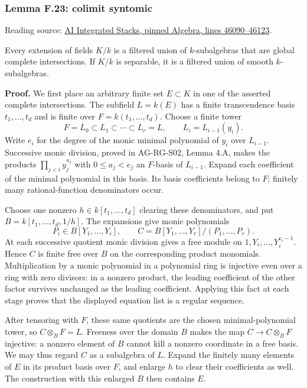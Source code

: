 \documentclass[11pt,a4paper,openany]{report}
\begin{document}
\label{AG-RG-S05-algebra-lemma-colimit-syntomic}

\subsubsection{Lemma F.23: colimit syntomic}\label{AG-RG-S05-lemma-f.23-colimit-syntomic}

Reading source: \href{https://github.com/KokunoYumeto/unofficial-stacks-project-ai-drafts/blob/565b10e987aba5969b21145a0833f42d69f96790/algebra.tex\#L46090-L46123}{AI Integrated Stacks, pinned Algebra, lines 46090--46123}.

Every extension of fields \(K/k\) is a filtered union of \(k\)-subalgebras that are global complete intersections. If \(K/k\) is separable, it is a filtered union of smooth \(k\)-subalgebras.

\textbf{Proof.} We first place an arbitrary finite set \(E\subset K\) in one of the asserted complete intersections. The subfield \(L=k(E)\) has a finite transcendence basis \(t_1,\ldots,t_d\) and is finite over \(F=k(t_1,\ldots,t_d)\). Choose a finite tower \[F=L_0\subset L_1\subset\cdots\subset L_r=L,\qquad L_i=L_{i-1}(y_i).\] Write \(e_i\) for the degree of the monic minimal polynomial of \(y_i\) over \(L_{i-1}\). Successive monic division, proved in AG-RG-S02, Lemma 4.A, makes the products \(\prod_{j<i}y_j^{a_j}\) with \(0\leq a_j<e_j\) an \(F\)-basis of \(L_{i-1}\). Expand each coefficient of the minimal polynomial in this basis. Its basis coefficients belong to \(F\); finitely many rational-function denominators occur.

Choose one nonzero \(h\in k[t_1,\ldots,t_d]\) clearing these denominators, and put \(B=k[t_1,\ldots,t_d,1/h]\). The expansions give monic polynomials \[P_i\in B[Y_1,\ldots,Y_i],\qquad
C=B[Y_1,\ldots,Y_r]/(P_1,\ldots,P_r).\] At each successive quotient monic division gives a free module on \(1,Y_i,\ldots,Y_i^{e_i-1}\). Hence \(C\) is finite free over \(B\) on the corresponding product monomials. Multiplication by a monic polynomial in a polynomial ring is injective even over a ring with zero divisors: in a nonzero product, the leading coefficient of the other factor survives unchanged as the leading coefficient. Applying this fact at each stage proves that the displayed equation list is a regular sequence.

After tensoring with \(F\), these same quotients are the chosen minimal-polynomial tower, so \(C\otimes_BF=L\). Freeness over the domain \(B\) makes the map \(C\to C\otimes_BF\) injective: a nonzero element of \(B\) cannot kill a nonzero coordinate in a free basis. We may thus regard \(C\) as a subalgebra of \(L\). Expand the finitely many elements of \(E\) in its product basis over \(F\), and enlarge \(h\) to clear their coefficients as well. The construction with this enlarged \(B\) then contains \(E\).
\end{document}
